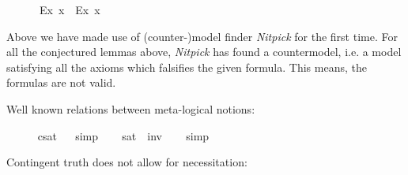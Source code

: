 \begin{isabellebody}
%
\isadelimproof
\ %
\endisadelimproof
%
\isatagproof
{}\isamarkupfalse%
\ %
%
\endisatagproof
{\isafoldproof}%
%
\isadelimproof
%
\endisadelimproof
\isanewline
\ \isamarkupfalse%
\ {\isachardoublequoteopen}{\isasymlfloor}\isactrlbold {\isasymbox}{\isacharparenleft}\isactrlbold {\isasymforall}\isactrlsup Ex{\isachardot}{\isacharparenleft}{\isasymphi}\ x{\isacharparenright}{\isacharparenright}\ \isactrlbold {\isasymrightarrow}\ {\isacharparenleft}\isactrlbold {\isasymforall}\isactrlsup Ex{\isachardot}\isactrlbold {\isasymbox}{\isacharparenleft}{\isasymphi}\ x{\isacharparenright}{\isacharparenright}{\isasymrfloor}{\isachardoublequoteclose}\ \isamarkupfalse%
%
\isadelimproof
\ %
\endisadelimproof
%
\isatagproof
{}\isamarkupfalse%
\ %
%
\endisatagproof
{\isafoldproof}%
%
\isadelimproof
%
\endisadelimproof
%
\begin{isamarkuptext}%
Above we have made use of (counter-)model finder \emph{Nitpick} \cite{Nitpick} for the first time.  
For all the conjectured lemmas above, \emph{Nitpick} has found a countermodel, i.e. a model satisfying all 
the axioms which falsifies the given formula. This means, the formulas are not valid.%
\end{isamarkuptext}\isamarkuptrue%
%
\begin{isamarkuptext}%
Well known relations between meta-logical notions:%
\end{isamarkuptext}\isamarkuptrue%
\ \isamarkupfalse%
\ \ {\isachardoublequoteopen}{\isasymlfloor}{\isasymphi}{\isasymrfloor}\ {\isasymlongleftrightarrow}\ {\isasymnot}{\isasymlfloor}{\isasymphi}{\isasymrfloor}\isactrlsup c\isactrlsup s\isactrlsup a\isactrlsup t{\isachardoublequoteclose}%
\isadelimproof
\ %
\endisadelimproof
%
\isatagproof
{}\isamarkupfalse%
\ simp%
\endisatagproof
{\isafoldproof}%
%
\isadelimproof
%
\endisadelimproof
\isanewline
\ \isamarkupfalse%
\ \ {\isachardoublequoteopen}{\isasymlfloor}{\isasymphi}{\isasymrfloor}\isactrlsup s\isactrlsup a\isactrlsup t\ {\isasymlongleftrightarrow}\ {\isasymnot}{\isasymlfloor}{\isasymphi}{\isasymrfloor}\isactrlsup i\isactrlsup n\isactrlsup v\ {\isachardoublequoteclose}%
\isadelimproof
\ %
\endisadelimproof
%
\isatagproof
{}\isamarkupfalse%
\ simp%
\endisatagproof
{\isafoldproof}%
%
\isadelimproof
%
\endisadelimproof
%
\begin{isamarkuptext}%
Contingent truth does not allow for necessitation:%

\end{isamarkuptext}
\end{isabellebody}
